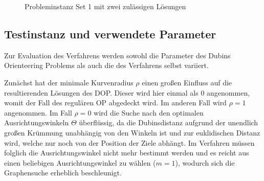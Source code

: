 \documentclass[12pt,a4paper,twoside]{article}
\theoremstyle{definition}
\numberwithin{equation}{section}
\begin{document}
\begin{figure}[h]
	\centering
	\qquad
	\caption{Probleminstanz Set 1 mit zwei zulässigen Lösungen}
	\label{fig:Set1_Dubinspath_rad01.png}
\end{figure}

\subsection{Testinstanz und verwendete Parameter}\label{subsection:testinstance}
Zur Evaluation des Verfahrens werden sowohl die Parameter des Dubins Orienteering Problems als auch die des Verfahrens selbst variiert.

Zunächst hat der minimale Kurvenradius $\rho$ einen großen Einfluss auf die resultierenden Lösungen des DOP. Dieser wird hier einmal als 0 angenommen, womit der Fall des regulären OP abgedeckt wird. Im anderen Fall wird $\rho = 1$ angenommen.
Im Fall $\rho = 0$ wird die Suche nach den optimalen Ausrichtungswinkeln $\Theta$ überflüssig, da die Dubinsdistanz aufgrund der unendlich großen Krümmung unabhängig von den Winkeln ist und zur euklidischen Distanz wird, welche nur noch von der Position der Ziele abhängt. Im Verfahren müssen folglich die Ausrichtungswinkel nicht mehr bestimmt werden und es reicht aus einen beliebigen Ausrichtungswinkel zu wählen ($m=1$), wodurch sich die Graphensuche erheblich beschleunigt.
\end{document}
